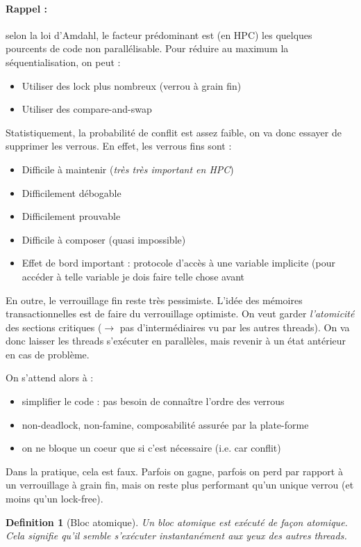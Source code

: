 \documentclass{article}
\newtheorem{defi}{Definition}
\begin{document}
\paragraph{Rappel :} selon la loi d'Amdahl, le facteur prédominant est (en HPC) les quelques pourcents de code non parallélisable. Pour réduire au maximum la séquentialisation, on peut :
\begin{itemize}
\item Utiliser des lock plus nombreux (verrou à grain fin)
\item Utiliser des compare-and-swap
\end{itemize}
Statistiquement, la probabilité de conflit est assez faible, on va donc essayer de supprimer les verrous.
En effet, les verrous fins sont :
\begin{itemize}
\item Difficile à maintenir (\emph{très très important en HPC})
\item Difficilement débogable
\item Difficilement prouvable
\item Difficile à composer (quasi impossible)
\item Effet de bord important : protocole d'accès à une variable implicite (pour accéder à telle variable je dois faire telle chose avant
\end{itemize}

En outre, le verrouillage fin reste très pessimiste. L'idée des mémoires transactionnelles est de faire du verrouillage optimiste. On veut garder \emph{l'atomicité} des sections critiques ($\to$ pas d'intermédiaires vu par les autres threads). On va donc laisser les threads s'exécuter en parallèles, mais revenir à un état antérieur en cas de problème.

On s'attend alors à :
\begin{itemize}
\item simplifier le code : pas besoin de connaître l'ordre des verrous
\item non-deadlock, non-famine, composabilité assurée par la plate-forme
\item on ne bloque un coeur que si c'est nécessaire (i.e. car conflit)
\end{itemize}

Dans la pratique, cela est faux. Parfois on gagne, parfois on perd par rapport à un verrouillage à grain fin, mais on reste plus performant qu'un unique verrou (et moins qu'un lock-free).

\begin{defi}[Bloc atomique]
Un bloc atomique est exécuté de façon atomique. Cela signifie qu'il semble s'exécuter instantanément aux yeux des autres threads.
\end{defi}
\end{document}
